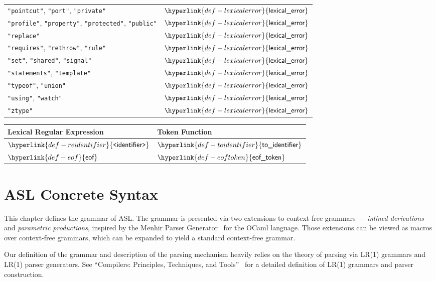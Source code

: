 \documentclass{book}
\newcommand\eof[0]{\hyperlink{def-eof}{\textsf{eof}}}
\newcommand\REidentifier[0]{\hyperlink{def-reidentifier}{\texttt{<}\textsf{identifier}\texttt{>}}}
\newcommand\lexicalerror[0]{\hyperlink{def-lexicalerror}{\textsf{lexical\_error}}}
\newcommand\toidentifier[0]{\hyperlink{def-toidentifier}{\textsf{to\_identifier}}}
\newcommand\eoftoken[0]{\hyperlink{def-eoftoken}{\textsf{eof\_token}}}
\begin{document}
\begin{center}
\begin{tabular}{ll}
\texttt{"pointcut"}, \texttt{"port"}, \texttt{"private"} & $\lexicalerror$ \\
\texttt{"profile"}, \texttt{"property"}, \texttt{"protected"}, \texttt{"public"} & $\lexicalerror$ \\
\texttt{"replace"} & $\lexicalerror$ \\
\texttt{"requires"}, \texttt{"rethrow"}, \texttt{"rule"} & $\lexicalerror$ \\
\texttt{"set"}, \texttt{"shared"}, \texttt{"signal"} & $\lexicalerror$ \\
\texttt{"statements"}, \texttt{"template"} & $\lexicalerror$ \\
\texttt{"typeof"}, \texttt{"union"} & $\lexicalerror$ \\
\texttt{"using"}, \texttt{"watch"} & $\lexicalerror$ \\
\texttt{"ztype"} & $\lexicalerror$ \\
\hline
\end{tabular}
\end{center}

\begin{center}
\begin{tabular}{ll}
\textbf{Lexical Regular Expression} & \textbf{Token Function}\\
\hline
$\REidentifier$   & $\toidentifier$ \\
$\eof$            & $\eoftoken$ \\
\hline
\end{tabular}
\end{center}

\chapter{ASL Concrete Syntax \label{chap:parsing}}

This chapter defines the grammar of ASL. The grammar is presented via two extensions
to context-free grammars --- \emph{inlined derivations} and \emph{parametric productions},
inspired by the Menhir Parser Generator~\cite{MenhirManual} for the OCaml language.
Those extensions can be viewed as macros over context-free grammars, which can be
expanded to yield a standard context-free grammar.

Our definition of the grammar and description of the parsing mechanism heavily relies
on the theory of parsing via LR(1) grammars and LR(1) parser generators.
%
See ``Compilers: Principles, Techniques, and Tools''~\cite{ASU86} for a detailed
definition of LR(1) grammars and parser construction.
\end{document}
